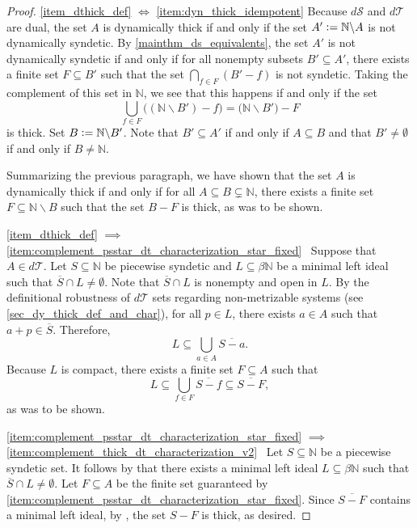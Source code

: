 \documentclass[letter,11pt]{article}
\theoremstyle{plain}
\theoremstyle{definition}
\theoremstyle{plain}
\theoremstyle{plain}
\numberwithin{equation}{section}
\newcommand{\N}{\mathbb{N}}
\newcommand{\defeq}{\vcentcolon=}
\renewcommand{\setminus}{\backslash}
\newcommand{\dsyndetic}{d\mathcal{S}}
\newcommand{\dthick}{d\mathcal{T}}
\begin{document}
\begin{proof}
    \eqref{item_dthick_def} $\iff$ \eqref{item:dyn_thick_idempotent}
    Because $\dsyndetic$ and $\dthick$ are dual, the set $A$ is dynamically thick if and only if the set $A' \defeq \N \setminus A$ is not dynamically syndetic.  By \cref{mainthm_ds_equivalents}, the set $A'$ is not dynamically syndetic if and only if for all nonempty subsets $B' \subseteq A'$, there exists a finite set $F \subseteq B'$ such that the set $\bigcap_{f \in F} (B' - f)$ is not syndetic.  Taking the complement of this set in $\N$, we see that this happens if and only if the set
    \[ \bigcup_{f \in F} \big( (\N \setminus B') - f \big) = \big( \N \setminus B' \big) - F\]
    is thick.  Set $B \defeq \N \setminus B'$. Note that $B' \subseteq A'$ if and only if $A \subseteq B$ and that $B' \neq \emptyset$ if and only if $B \neq \N$.
    
    Summarizing the previous paragraph, we have shown that the set $A$ is dynamically thick if and only if for all $A \subseteq B \subsetneq \N$, there exists a finite set $F \subseteq \N \setminus B$ such that the set $B - F$ is thick, as was to be shown.

    \eqref{item_dthick_def} $\implies$ \eqref{item:complement_psstar_dt_characterization_star_fixed} \ Suppose that $A \in \dthick$.  Let $S \subseteq \N$ be piecewise syndetic and $L \subseteq \beta \N$ be a minimal left ideal such that $\overline{S} \cap L \neq \emptyset$.  Note that $\overline{S} \cap L$ is nonempty and open in $L$. By the definitional robustness of $\dthick$ sets regarding non-metrizable systems (see \cref{sec_dy_thick_def_and_char}), for all $p \in L$, there exists $a \in A$ such that $a + p \in \overline{S}$.  Therefore,
    \[L \subseteq \bigcup_{a \in A} \overline{S - a}.\]
    Because $L$ is compact, there exists a finite set $F \subseteq A$ such that
    \[L \subseteq \bigcup_{f \in F} \overline{S - f}  \subseteq \overline{S-F},\]
    as was to be shown.

    \eqref{item:complement_psstar_dt_characterization_star_fixed} $\implies$ \eqref{item:complement_thick_dt_characterization_v2} \ Let $S \subseteq \N$ be a piecewise syndetic set.  It follows by \cite[Thm. 4.40]{hindman_strauss_book_2012} that there exists a minimal left ideal $L \subseteq \beta \N$ such that $\overline{S} \cap L \neq \emptyset$.  Let $F \subseteq A$ be the finite set guaranteed by \eqref{item:complement_psstar_dt_characterization_star_fixed}.  Since $\overline{S-F}$ contains a minimal left ideal, by \cite[Thm. 4.48]{hindman_strauss_book_2012}, the set $S-F$ is thick, as desired.


\end{proof}
\end{document}
